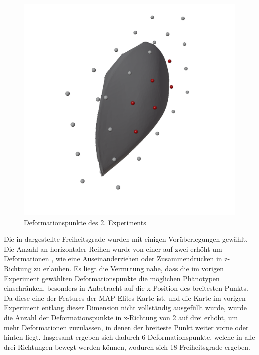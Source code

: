 \begin{figure}[h]
	\centering
	\includegraphics[width=.7\linewidth]{bilder/6ptDeformationPoints}
	\caption{Deformationspunkte des 2. Experiments}
	\label{fig:ffd2nd}
\end{figure}
Die in \todo{} dargestellte Freiheitsgrade wurden mit einigen Vorüberlegungen gewählt.
Die Anzahl an horizontaler Reihen wurde von einer auf zwei erhöht um Deformationen , wie eine Auseinanderziehen oder Zusammendrücken in z-Richtung zu erlauben.
Es liegt die Vermutung nahe, dass die im vorigen Experiment gewählten Deformationspunkte die möglichen Phänotypen einschränken, besonders in Anbetracht auf die x-Position des breitesten Punkts.
Da diese eine der Features der MAP-Elites-Karte ist, und die Karte im vorigen Experiment entlang dieser Dimension nicht vollständig ausgefüllt wurde, wurde die Anzahl der Deformationspunkte in x-Richtung von 2 auf drei erhöht, um mehr Deformationen zuzulassen, in denen der breiteste Punkt weiter vorne oder hinten liegt.
Insgesamt ergeben sich dadurch 6 Deformationspunkte, welche in alle drei Richtungen bewegt werden können, wodurch sich 18 Freiheitsgrade ergeben.

